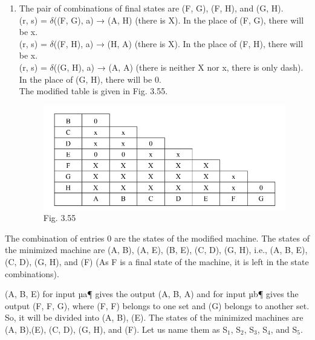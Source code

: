 \documentclass[11pt,apacite]{article}
\begin{document}
\begin{enumerate}
		 \item The pair of combinations of final states are (F, G), (F, H), and (G, H).\\
		 (r, s) = $\delta$((F, G), a) → (A, H) (there is X). In the place of (F, G), there will be x.\\
		 (r, s) = $\delta$((F, H), a) → (H, A) (there is X). In the place of (F, H), there will be x.\\
		 (r, s) = $\delta$((G, H), a) → (A, A) (there is neither X nor x, there is only dash). In the
		 place of (G, H), there will be 0.\\
		 
		 The modified table is given in Fig. 3.55.\\
		 
		 	\begin{figure}[H]
		 	\begin{center}
		 		\begin{center}
		 			\includegraphics[scale=.45]{Fig355.png}
		 		\end{center}
		 		\caption{Fig. 3.55}
		 	\end{center}
		 \end{figure}
		 
\end{enumerate}

The combination of entries 0 are the states of the modified machine. The states of the minimized
machine are (A, B), (A, E), (B, E), (C, D), (G, H), i.e., (A, B, E), (C, D), (G, H), and (F) (As F is
a final state of the machine, it is left in the state combinations).

(A, B, E) for input µa¶ gives the output (A, B, A) and for input µb¶ gives the output (F, F, G),
where (F, F) belongs to one set and (G) belongs to another set. So, it will be divided into (A, B), (E).
The states of the minimized machines are (A, B),(E), (C, D), (G, H), and (F). Let us name them
as S$_1$, S$_2$, S$_3$, S$_4$, and S$_5$.
\end{document}
